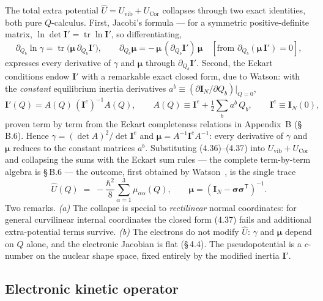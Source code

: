 The total extra potential $\hat U=U_{\mathrm{vib}}+U_{\mathrm{Cor}}$ collapses through two exact identities, both pure $Q$-calculus. First, Jacobi's formula --- for a symmetric positive-definite matrix, $\ln\det\mathbf I'=\operatorname{tr}\ln\mathbf I'$, so differentiating,
\begin{equation}
\partial_{Q_b}\!\ln\gamma=\operatorname{tr}\!\bigl(\boldsymbol\mu\,\partial_{Q_b}\mathbf I'\bigr),
\qquad
\partial_{Q_b}\boldsymbol\mu=-\,\boldsymbol\mu\,(\partial_{Q_b}\mathbf I')\,\boldsymbol\mu
\quad[\text{from }\partial_{Q_b}(\boldsymbol\mu\,\mathbf I')=0], \tag{4.36}
\end{equation}
expresses every derivative of $\gamma$ and $\boldsymbol\mu$ through $\partial_{Q_b}\mathbf I'$. Second, the Eckart conditions endow $\mathbf I'$ with a remarkable exact closed form, due to Watson: with the \emph{constant} equilibrium inertia derivatives $a^{b}\equiv(\partial\mathbf I_N/\partial Q_b)|_{Q=0}$,
\begin{equation}
\mathbf I'(Q)=A(Q)\,(\mathbf I^{e})^{-1}A(Q),\qquad
A(Q)\equiv\mathbf I^{e}+\tfrac12\sum_b a^{b}\,Q_b,\qquad
\mathbf I^{e}\equiv\mathbf I_N(0), \tag{4.37}
\end{equation}
proven term by term from the Eckart completeness relations in Appendix~B (\S\,B.6). Hence $\gamma=(\det A)^2/\det\mathbf I^{e}$ and $\boldsymbol\mu=A^{-1}\mathbf I^{e}A^{-1}$: every derivative of $\gamma$ and $\boldsymbol\mu$ reduces to the constant matrices $a^{b}$. Substituting (4.36)--(4.37) into $U_{\mathrm{vib}}+U_{\mathrm{Cor}}$ and collapsing the sums with the Eckart sum rules --- the complete term-by-term algebra is \S\,B.6 --- the outcome, first obtained by Watson~\cite{watson1968}, is the single trace
\begin{equation}
\boxed{\;\hat U(Q)\;=\;-\frac{\hbar^{2}}{8}\sum_{\alpha=1}^{3}\mu_{\alpha\alpha}(Q),\qquad \boldsymbol{\mu}=(\mathbf{I}_N-\boldsymbol{\sigma}\boldsymbol{\sigma}^{\mathsf T})^{-1}.\;} \tag{4.38}
\end{equation}
Two remarks. \emph{(a)} The collapse is special to \emph{rectilinear} normal coordinates: for general curvilinear internal coordinates the closed form (4.37) fails and additional extra-potential terms survive. \emph{(b)} The electrons do not modify $\hat U$: $\gamma$ and $\boldsymbol\mu$ depend on $Q$ alone, and the electronic Jacobian is flat (\S\,4.4). The pseudopotential is a $c$-number on the nuclear shape space, fixed entirely by the modified inertia $\mathbf I'$.

\subsection{Electronic kinetic operator}

